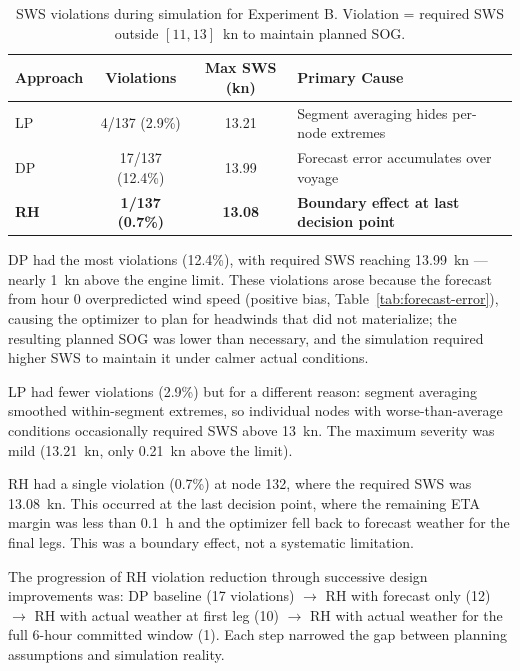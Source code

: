 \documentclass[review]{elsarticle}
\begin{document}
\begin{table}[htbp]
\centering
\caption{SWS violations during simulation for Experiment B. Violation = required SWS outside $[11, 13]$~kn to maintain planned SOG.}
\label{tab:violations}
\begin{tabular}{lccl}
\toprule
Approach & Violations & Max SWS (kn) & Primary Cause \\
\midrule
LP  & 4/137 (2.9\%)  & 13.21 & Segment averaging hides per-node extremes \\
DP  & 17/137 (12.4\%) & 13.99 & Forecast error accumulates over voyage \\
\textbf{RH} & \textbf{1/137 (0.7\%)} & \textbf{13.08} & \textbf{Boundary effect at last decision point} \\
\bottomrule
\end{tabular}
\end{table}

DP had the most violations (12.4\%), with required SWS reaching 13.99~kn --- nearly 1~kn above the engine limit. These violations arose because the forecast from hour 0 overpredicted wind speed (positive bias, Table~\ref{tab:forecast-error}), causing the optimizer to plan for headwinds that did not materialize; the resulting planned SOG was lower than necessary, and the simulation required higher SWS to maintain it under calmer actual conditions.

LP had fewer violations (2.9\%) but for a different reason: segment averaging smoothed within-segment extremes, so individual nodes with worse-than-average conditions occasionally required SWS above 13~kn. The maximum severity was mild (13.21~kn, only 0.21~kn above the limit).

RH had a single violation (0.7\%) at node 132, where the required SWS was 13.08~kn. This occurred at the last decision point, where the remaining ETA margin was less than 0.1~h and the optimizer fell back to forecast weather for the final legs. This was a boundary effect, not a systematic limitation.

The progression of RH violation reduction through successive design improvements was: DP baseline (17 violations) $\rightarrow$ RH with forecast only (12) $\rightarrow$ RH with actual weather at first leg (10) $\rightarrow$ RH with actual weather for the full 6-hour committed window (1). Each step narrowed the gap between planning assumptions and simulation reality.

\end{document}
